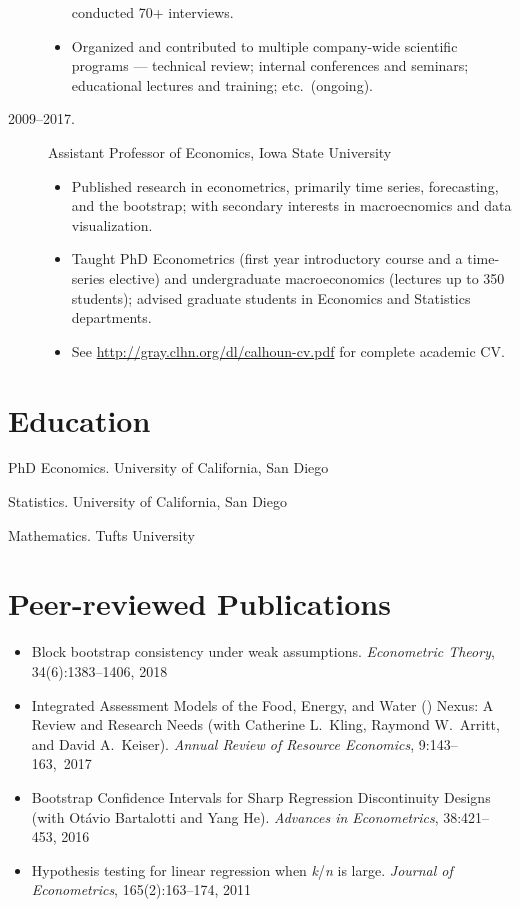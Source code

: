 \documentclass[10pt]{safecv}%
\begin{document}
\begin{description}
\begin{itemize}
    conducted 70+ interviews.
  \item Organized and contributed to multiple company-wide scientific
    programs --- technical review; internal conferences and seminars;
    educational lectures and training; etc.\ (ongoing).
  \end{itemize}
\item[2009--2017.] Assistant Professor of Economics, Iowa State University
  \begin{itemize}
  \item Published research in econometrics, primarily time
    series, forecasting, and the bootstrap; with secondary interests
    in macroecnomics and data visualization.
   \item Taught PhD Econometrics (first year introductory course and
     a time-series elective) and undergraduate macroeconomics (lectures up to 350 students); advised
     graduate students in Economics and Statistics departments.
   \item See \url{http://gray.clhn.org/dl/calhoun-cv.pdf} for complete
     academic CV.
   \end{itemize}
\end{description}

\section*{Education}

\begin{description}[noitemsep]
\item[2009.] PhD Economics. University of California, San Diego
\item[2006.]  Statistics. University of California, San Diego
\item[2001.]  Mathematics. Tufts University
\end{description}

\section*{Peer-reviewed Publications}

\begin{itemize}[noitemsep]
\item Block bootstrap consistency under weak assumptions.
  \textit{Econometric Theory}, 34(6):1383--1406, 2018
\item Integrated Assessment Models of the Food, Energy, and Water
  () Nexus: A Review and Research Needs (with Catherine
  L.\ Kling, Raymond W.\ Arritt, and David A.\ Keiser). \textit{Annual
    Review of Resource Economics}, 9:143--163,~2017
\item Bootstrap Confidence Intervals for Sharp Regression
  Discontinuity Designs (with Ot\'avio Bartalotti and Yang
  He). \textit{Advances in Econometrics}, 38:421--453, 2016
\item Hypothesis testing for linear regression when
  \textit{k}/\textit{n} is large. \textit{Journal of Econometrics},
  165(2):163--174, 2011
\end{itemize}
\end{document}
